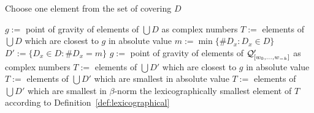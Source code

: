 \begin{algorithm}
   \caption{Choose one element from the set of covering $D$ }
   \label{alg:pickElement}   
  \begin{algorithmic}[1]
    	\STATE $g:=$ point of gravity of elements of $\bigcup D$ as complex numbers
    	\STATE $T:=$ elements of $\bigcup D$ which are closest to $g$ in absolute value
    \ELSE
    	\STATE $m:=\min\{\#D_x \colon D_x\in D \}$
    	\STATE $D':=\{D_x \in D \colon \#D_x=m\}$
    		\STATE $g:=$ point of gravity of elements of $\mathcal{Q}_{[w_{0}, \dots, w_{-k}]}'$ as complex numbers
    		\STATE $T:=$ elements of $\bigcup D'$ which are closest to $g$ in absolute value
			\STATE $T:=$ elements of $\bigcup D'$ which are smallest in absolute value
			\STATE $T:=$ elements of $\bigcup D'$ which are smallest in $\beta$-norm
    	\ENDIF
    \ENDIF    
    \RETURN the lexicographically smallest element of $T$ according to Definition~\ref{def:lexicographical}

  \end{algorithmic}
\end{algorithm}


